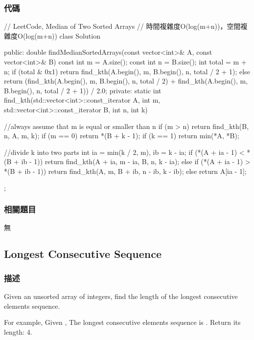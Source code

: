 \subsubsection{代碼}
\begin{Code}
// LeetCode, Median of Two Sorted Arrays
// 時間複雜度O(log(m+n))，空間複雜度O(log(m+n))
class Solution {
public:
    double findMedianSortedArrays(const vector<int>& A, const vector<int>& B) {
        const int m = A.size();
        const int n = B.size();
        int total = m + n;
        if (total & 0x1)
            return find_kth(A.begin(), m, B.begin(), n, total / 2 + 1);
        else
            return (find_kth(A.begin(), m, B.begin(), n, total / 2)
                    + find_kth(A.begin(), m, B.begin(), n, total / 2 + 1)) / 2.0;
    }
private:
    static int find_kth(std::vector<int>::const_iterator A, int m, 
            std::vector<int>::const_iterator B, int n, int k) {
        //always assume that m is equal or smaller than n
        if (m > n) return find_kth(B, n, A, m, k);
        if (m == 0) return *(B + k - 1);
        if (k == 1) return min(*A, *B);

        //divide k into two parts
        int ia = min(k / 2, m), ib = k - ia;
        if (*(A + ia - 1) < *(B + ib - 1))
            return find_kth(A + ia, m - ia, B, n, k - ia);
        else if (*(A + ia - 1) > *(B + ib - 1))
            return find_kth(A, m, B + ib, n - ib, k - ib);
        else
            return A[ia - 1];
    }
};
\end{Code}


\subsubsection{相關題目}

\begindot
\item 無
\myenddot


\subsection{Longest Consecutive Sequence} %
\label{sec:longest-consecutive-sequence}


\subsubsection{描述}
Given an unsorted array of integers, find the length of the longest consecutive elements sequence.

For example,
Given \code{\[100, 4, 200, 1, 3, 2\]},
The longest consecutive elements sequence is \code{\[1, 2, 3, 4\]}. Return its length: 4.

